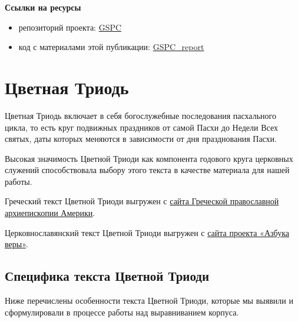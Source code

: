 \documentclass[
  letterpaper,
]{book}
\begin{document}
\begin{tcolorbox}[enhanced jigsaw, rightrule=.15mm, breakable, colframe=quarto-callout-note-color-frame, colback=white, leftrule=.75mm, left=2mm, arc=.35mm, opacityback=0, toprule=.15mm, bottomrule=.15mm]

\textbf{Ссылки на ресурсы}\vspace{2mm}

\begin{itemize}
\item
  репозиторий проекта:
  \href{https://github.com/Drozhzhinastya/GSPC}{GSPC}
\item
  код с материалами этой публикации:
  \href{https://github.com/levshadrin/GSPC_report}{GSPC\_report}
\end{itemize}

\end{tcolorbox}

\hfill\break


\hypertarget{sec-about_pent}{%
\chapter{Цветная Триодь}\label{sec-about_pent}}

Цветная Триодь включает в себя богослужебные последования пасхального
цикла, то есть круг подвижных праздников от самой Пасхи до Недели Всех
святых, даты которых меняются в зависимости от дня празднования Пасхи.

Высокая значимость Цветной Триоди как компонента годового круга
церковных служений способствовала выбору этого текста в качестве
материала для нашей работы.

Греческий текст Цветной Триоди выгружен с
\href{https://glt.goarch.org/\#04}{сайта Греческой православной
архиепископии Америки}.

Церковнославянский текст Цветной Триоди выгружен с
\href{https://azbyka.ru/otechnik/Pravoslavnoe_Bogosluzhenie/triod-tsvetnaja/}{сайта
проекта «Азбука веры»}.

\hypertarget{sec-about_pent_specifics}{%
\section{Специфика текста Цветной
Триоди}\label{sec-about_pent_specifics}}

Ниже перечислены особенности текста Цветной Триоди, которые мы выявили и
сформулировали в процессе работы над выравниванием корпуса.
\end{document}
